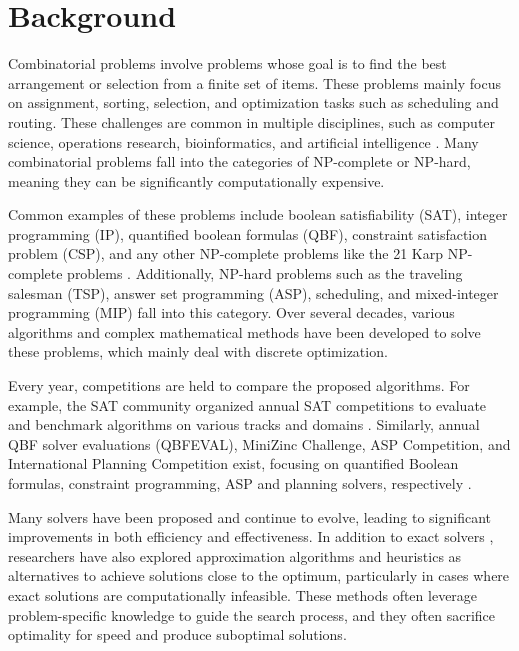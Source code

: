 
\chapter{Background}

Combinatorial problems involve problems whose goal is to find the best arrangement or selection from a finite set of items. These problems mainly focus on assignment, sorting, selection, and optimization tasks such as scheduling and routing. These challenges are common in multiple disciplines, such as computer science, operations research, bioinformatics, and artificial intelligence \cite{series/faia/336}. Many combinatorial problems fall into the categories of NP-complete or NP-hard, meaning they can be significantly computationally expensive. 

Common examples of these problems include boolean satisfiability (SAT), integer programming (IP), quantified boolean formulas (QBF), constraint satisfaction problem (CSP), and any other NP-complete problems like the 21 Karp NP-complete problems \cite{Karp1972}. Additionally, NP-hard problems such as the traveling salesman (TSP), answer set programming (ASP), scheduling, and mixed-integer programming (MIP) fall into this category. Over several decades, various algorithms and complex mathematical methods have been developed to solve these problems, which mainly deal with discrete optimization. 

Every year, competitions are held to compare the proposed algorithms. For example, the SAT community organized annual SAT competitions to evaluate and benchmark algorithms on various tracks and domains \cite{balyo_sat_2017}. Similarly, annual QBF solver evaluations (QBFEVAL), MiniZinc Challenge, ASP Competition, and International Planning Competition exist, focusing on quantified Boolean formulas, constraint programming, ASP and planning solvers, respectively \cite{PULINA2019224,Stuckey_Feydy_Schutt_Tack_Fischer_2014, GEBSER_2019, taitler-et-al-aimag2024}.

Many solvers have been proposed and continue to evolve, leading to significant improvements in both efficiency and effectiveness. In addition to exact solvers \cite{gerhard_j__woeginger_2002}, researchers have also explored approximation algorithms \cite{books/daglib/0030297} and heuristics \cite{10.5555/525} as alternatives to achieve solutions close to the optimum, particularly in cases where exact solutions are computationally infeasible. These methods often leverage problem-specific knowledge to guide the search process, and they often sacrifice optimality for speed and produce suboptimal solutions.

